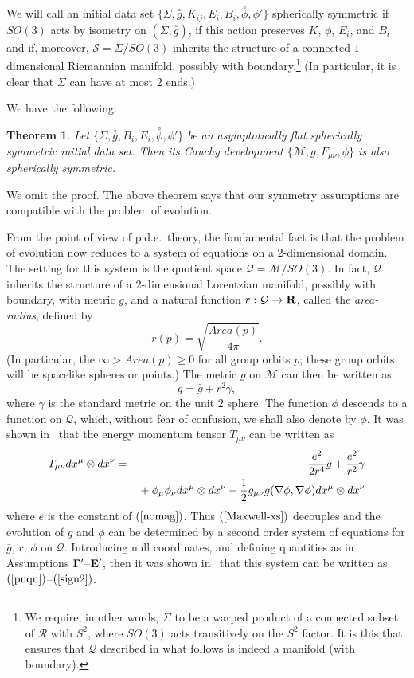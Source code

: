 \documentclass{article}
\newtheorem{theorem}{Theorem}[section]
\begin{document}
We will call an initial data set $\{\Sigma,\stackrel{\circ}g,
K_{ij}, E_i, B_i, \stackrel{\circ}\phi, \phi'\}$
spherically symmetric if $SO(3)$
acts by isometry on $(\Sigma, \stackrel\circ{g})$, 
if this action preserves $K$, $\phi$,
$E_i$, and $B_i$ and if, moreover,
$\mathcal{S}=\Sigma/SO(3)$ inherits 
the structure of a connected $1$-dimensional Riemannian manifold,
possibly with boundary.\footnote{We require, in other words,
$\Sigma$ to be a warped product of a connected
subset of $\mathcal{R}$ with $S^2$, where $SO(3)$ acts
transitively on the $S^2$ factor. It is this that ensures
that $\mathcal{Q}$ described in what follows is indeed a manifold (with boundary).}
(In particular, it is clear that $\Sigma$ can have at most $2$
ends.)

We have the following:
\begin{theorem}
Let $\{\Sigma,\stackrel\circ{g}, B_i, E_i,
\stackrel\circ\phi, \phi'\}$
be an asymptotically flat
spherically symmetric initial data set. Then its
Cauchy development $\{\mathcal{M},g,
F_{\mu\nu},\phi\}$ is also spherically symmetric. 
\end{theorem}
We omit the proof. The above theorem says that our symmetry assumptions
are compatible with the problem of evolution. 

From the point of view of p.d.e.~theory, the fundamental fact
is that the problem of evolution now reduces to a system
of equations on a $2$-dimensional domain. The setting
for this system is the quotient space $\mathcal{Q}=\mathcal{M}/SO(3)$.
In fact, $\mathcal{Q}$ inherits the structure
of a $2$-dimensional Lorentzian manifold, possibly with boundary,
with metric $\bar{g}$, and a natural
function $r:\mathcal{Q}\to{\bf R}$, called the \emph{area-radius}, 
defined by
\begin{equation}
\label{r-orismos}
r(p)=\sqrt{\frac{Area(p)}{4\pi}}.
\end{equation}
(In particular, the $\infty>Area(p)\ge 0$ for all group orbits $p$;
these group orbits will be spacelike spheres or points.)
The metric $g$ on $\mathcal{M}$ can then be written as
\[
g=\bar{g}+ r^2\gamma,
\] 
where $\gamma$ is the standard metric on the unit $2$ sphere.
The function $\phi$ descends to a function on $\mathcal{Q}$, which,
without fear of confusion, we shall also denote by $\phi$.
It was shown in~\cite{md:si} that the
energy momentum tensor $T_{\mu\nu}$
can be written as 
\begin{eqnarray}
\label{edw}
\nonumber
T_{\mu\nu}dx^\mu\otimes dx^\nu&=&\frac{e^2}{2r^4}\bar{g}+\frac{e^2}{r^2}\gamma
\\
&&\hbox{}+\phi_\mu\phi_\nu dx^\mu\otimes dx^\nu-\frac12g_{\mu\nu}g(\nabla\phi,\nabla\phi)
dx^\mu\otimes dx^\nu
\end{eqnarray}
where $e$ is the constant of $(\ref{nomag})$. 
Thus $(\ref{Maxwell-xs})$ decouples and the evolution 
of $g$ and $\phi$ can be determined by a second order
system of equations for $\bar{g}$, $r$, $\phi$ on $\mathcal{Q}$.
Introducing null coordinates, and defining quantities as
in Assumptions ${\bf \Gamma}'$--${\bf E}'$,
then it was shown in~\cite{md:si} that this system can be 
written as $(\ref{puqu})$--$(\ref{sign2})$.
\end{document}
